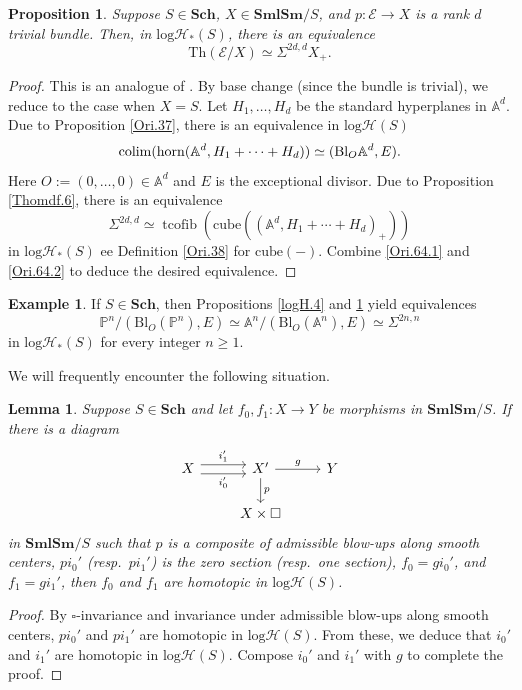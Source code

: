 \documentclass[11pt, a4paper]{amsart}
\newtheorem{prop}[thm]{Proposition}
\newtheorem{lem}[thm]{Lemma}
\theoremstyle{definition}
\newtheorem{exm}[thm]{Example}
\numberwithin{equation}{subsection}
\renewcommand{\P}{\mathbb{P}}
\newcommand{\A}{\mathbb{A}}
\newcommand{\Sch}{\mathbf{Sch}}
\newcommand{\SmlSm}{\mathbf{SmlSm}}
\newcommand{\colimit}{\mathop{\rm colim}}
\newcommand{\Blow}{{\mathrm{Bl}}}
\newcommand{\Thom}{\mathrm{Th}}
\newcommand{\cE}{\mathcal{E}}
\newcommand{\boxx}{\square}
\newcommand{\tcofib}{\operatorname{tcofib}}
\newcommand{\horn}{\mathrm{horn}}
\newcommand{\cube}{\mathrm{cube}}
\newcommand{\inflogH}{\mathrm{log}\mathcal{H}}
\newcommand{\inflogHpt}{\mathrm{log}\mathcal{H}_\ast}
\begin{document}
\begin{prop}
\label{Ori.64}
Suppose $S\in \Sch$, $X\in \SmlSm/S$, and $p\colon \cE\to X$ is a rank $d$ trivial bundle.
Then, in $\inflogHpt(S)$, there is an equivalence
\[
\Thom(\cE/X)
\simeq
\Sigma^{2d,d}X_+.
\]
\end{prop}
\begin{proof} This is an analogue of \cite[Proposition 7.4.5]{logDM}.
By base change (since the bundle is trivial), we reduce to the case when $X=S$.
Let $H_1,\ldots,H_d$ be the standard hyperplanes in $\A^d$.
Due to Proposition \ref{Ori.37}, there is an equivalence in $\inflogH(S)$
\begin{equation}
\label{Ori.64.1}
\colimit(\horn(\A^d,H_1+\cdots+H_d))
\simeq
(\Blow_O \A^d,E).
\end{equation}
Here $O:=(0,\ldots,0)\in \A^d$ and $E$ is the exceptional divisor.
Due to Proposition \ref{Thomdf.6}, there is an equivalence
\begin{equation}
\label{Ori.64.2}
\Sigma^{2d,d}
\simeq
\tcofib(\cube((\A^d,H_1+\cdots+H_d)_+))
\end{equation}
in $\inflogHpt(S)$
ee Definition \ref{Ori.38} for $\cube(-)$.
Combine \eqref{Ori.64.1} and \eqref{Ori.64.2} to deduce the desired equivalence.
\end{proof}

\begin{exm}
\label{Ori.57}
If $S\in \Sch$, 
then Propositions \ref{logH.4} and \ref{Ori.64} yield equivalences
\begin{equation}
\label{Ori.57.2}
\P^n/(\Blow_O(\P^n),E)
\simeq
\A^n/(\Blow_O(\A^n),E)
\simeq
\Sigma^{2n,n}
\end{equation}
in $\inflogHpt(S)$ for every integer $n\geq 1$.
\end{exm}


We will frequently encounter the following situation.



\begin{lem}
\label{ProplogSH.7}
Suppose $S\in \Sch$ and let $f_0,f_1\colon X\to Y$ be morphisms in $\SmlSm/S$.
If there is a diagram
\[
\begin{tikzcd}
X\ar[r,shift left=0.75ex,"i_1'"]\ar[r,shift right=0.75ex,"i_0'"']&
X'\ar[d,"p"]\ar[r,"g"]&
Y
\\
&
X\times \boxx
\end{tikzcd}
\]
in $\SmlSm/S$ such that $p$ is a composite of admissible blow-ups along smooth centers,
$pi_0'$ (resp.\ $pi_1'$) is the zero section (resp.\ one section), $f_0=gi_0'$, and $f_1=gi_1'$, then $f_0$ and $f_1$ are
homotopic in $\inflogH(S)$.
\end{lem}
\begin{proof}
By $\square$-invariance and invariance under admissible blow-ups along smooth centers, $pi_0'$ and $pi_1'$ are homotopic in $\inflogH(S)$.
From these, we deduce that $i_0'$ and $i_1'$ are homotopic in $\inflogH(S)$.
Compose $i_0'$ and $i_1'$ with $g$ to complete the proof.
\end{proof}
\end{document}
